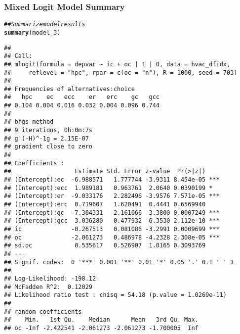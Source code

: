 \documentclass{beamer}\usepackage[]{graphicx}\usepackage[]{color}
\makeatletter
\newcommand{\hlcom}[1]{\textcolor[rgb]{0.678,0.584,0.686}{\textit{#1}}}%
\newcommand{\hlstd}[1]{\textcolor[rgb]{0.345,0.345,0.345}{#1}}%
\newcommand{\hlkwd}[1]{\textcolor[rgb]{0.737,0.353,0.396}{\textbf{#1}}}%
\newenvironment{kframe}{%
 \def\at@end@of@kframe{}%
 \ifinner\ifhmode%
  \def\at@end@of@kframe{\end{minipage}}%
  \begin{minipage}{\columnwidth}%
 \fi\fi%
 \def\FrameCommand##1{\hskip\@totalleftmargin \hskip-\fboxsep
 \colorbox{shadecolor}{##1}\hskip-\fboxsep
     \hskip-\linewidth \hskip-\@totalleftmargin \hskip\columnwidth}%
 \MakeFramed {\advance\hsize-\width
   \@totalleftmargin\z@ \linewidth\hsize
   \@setminipage}}%
 {\par\unskip\endMakeFramed%
 \at@end@of@kframe}
\newenvironment{knitrout}{}{} %
\makeatother
\begin{document}
\begin{frame}[fragile]\frametitle{Mixed Logit Model Summary}
	  \vspace{1ex}
\begin{knitrout}\tiny
{}\color{fgcolor}\begin{kframe}
\begin{alltt}
\hlcom{## Summarize model results}
\hlkwd{summary}\hlstd{(model_3)}
\end{alltt}
\begin{verbatim}
## 
## Call:
## mlogit(formula = depvar ~ ic + oc | 1 | 0, data = hvac_dfidx, 
##     reflevel = "hpc", rpar = c(oc = "n"), R = 1000, seed = 703)
## 
## Frequencies of alternatives:choice
##   hpc    ec   ecc    er   erc    gc   gcc 
## 0.104 0.004 0.016 0.032 0.004 0.096 0.744 
## 
## bfgs method
## 9 iterations, 0h:0m:7s 
## g'(-H)^-1g = 2.15E-07 
## gradient close to zero 
## 
## Coefficients :
##                  Estimate Std. Error z-value  Pr(>|z|)    
## (Intercept):ec  -6.988571   1.777744 -3.9311 8.454e-05 ***
## (Intercept):ecc  1.989181   0.963761  2.0640 0.0390199 *  
## (Intercept):er  -9.033176   2.282496 -3.9576 7.571e-05 ***
## (Intercept):erc  0.719607   1.620491  0.4441 0.6569940    
## (Intercept):gc  -7.304331   2.161066 -3.3800 0.0007249 ***
## (Intercept):gcc  3.036280   0.477932  6.3530 2.112e-10 ***
## ic              -0.267513   0.081086 -3.2991 0.0009699 ***
## oc              -2.061273   0.486978 -4.2328 2.308e-05 ***
## sd.oc            0.535617   0.526907  1.0165 0.3093769    
## ---
## Signif. codes:  0 '***' 0.001 '**' 0.01 '*' 0.05 '.' 0.1 ' ' 1
## 
## Log-Likelihood: -198.12
## McFadden R^2:  0.12029 
## Likelihood ratio test : chisq = 54.18 (p.value = 1.0269e-11)
## 
## random coefficients
##    Min.   1st Qu.    Median      Mean   3rd Qu. Max.
## oc -Inf -2.422541 -2.061273 -2.061273 -1.700005  Inf
\end{verbatim}
\end{kframe}
\end{knitrout}
\end{frame}
\end{document}
